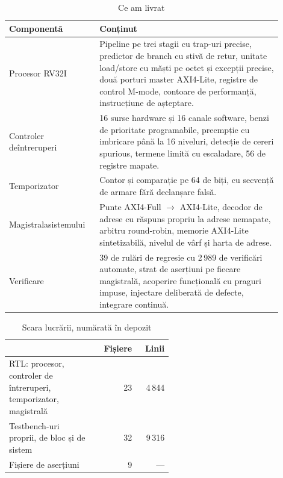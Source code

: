 \documentclass[11pt,openany]{report}
\begin{document}
\begin{table}[H]
\centering
\caption{Ce am livrat}
\label{tab:livrat}
\small
\begin{tabular}{@{}L{0.28\linewidth}L{0.62\linewidth}@{}}
\toprule
\textbf{Componentă} & \textbf{Conținut} \\
\midrule
Procesor RV32I &
  Pipeline pe trei stagii cu trap-uri precise, predictor de branch cu stivă de
  retur, unitate load/store cu măști pe octet și excepții precise, două porturi
  master AXI4-Lite, registre de control M-mode, contoare de performanță,
  instrucțiune de așteptare. \\
\addlinespace
Controler de\newline întreruperi &
  16 surse hardware și 16 canale software, benzi de prioritate programabile,
  preempție cu imbricare până la 16 niveluri, detecție de cereri spurious,
  termene limită cu escaladare, 56 de registre mapate. \\
\addlinespace
Temporizator &
  Contor și comparație pe 64 de biți, cu secvență de armare fără declanșare
  falsă. \\
\addlinespace
Magistrala\newline sistemului &
  Punte AXI4-Full $\rightarrow$ AXI4-Lite, decodor de adrese cu răspuns propriu
  la adrese nemapate, arbitru round-robin, memorie AXI4-Lite sintetizabilă,
  nivelul de vârf și harta de adrese. \\
\addlinespace
Verificare &
  39 de rulări de regresie cu 2\,989 de verificări automate, strat de aserțiuni
  pe fiecare magistrală, acoperire funcțională cu praguri impuse, injectare
  deliberată de defecte, integrare continuă. \\
\bottomrule
\end{tabular}
\end{table}

\begin{table}[H]
\centering
\caption{Scara lucrării, numărată în depozit}
\label{tab:scara}
\small
\begin{tabular}{@{}L{0.54\linewidth}rr@{}}
\toprule
 & \textbf{Fișiere} & \textbf{Linii} \\
\midrule
RTL: procesor, controler de întreruperi, temporizator, magistrală & 23 & 4\,844 \\
Testbench-uri proprii, de bloc și de sistem & 32 & 9\,316 \\
Fișiere de aserțiuni & 9 & --- \\
\bottomrule
\end{tabular}
\end{table}
\end{document}
